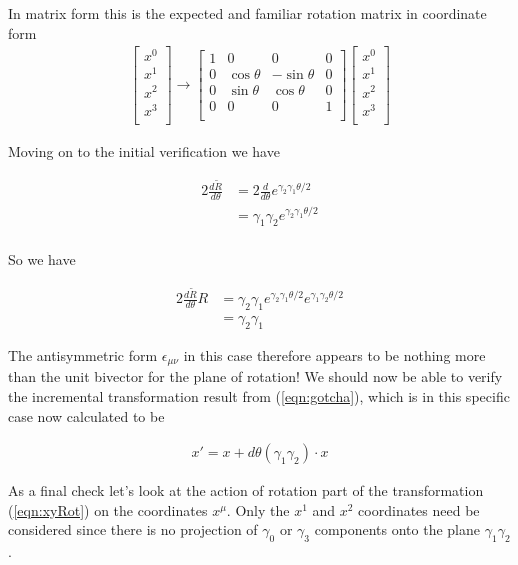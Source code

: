 In matrix form this is the expected and familiar rotation matrix in coordinate form
\begin{align*}
\begin{bmatrix}
x^0 \\
x^1 \\
x^2 \\
x^3 \\
\end{bmatrix}
\rightarrow
\begin{bmatrix}
1 & 0 & 0 & 0 \\
0 & \cos\theta & -\sin\theta & 0 \\
0 & \sin\theta & \cos\theta & 0 \\
0 & 0 & 0 & 1 \\
\end{bmatrix}
\begin{bmatrix}
x^0 \\
x^1 \\
x^2 \\
x^3 \\
\end{bmatrix}
\end{align*}

Moving on to the initial verification we have

\begin{align*}
2 \frac{d\tilde{R}}{d\theta} 
&= 2\frac{d}{d\theta} e^{\gamma_2\gamma_1 \theta/2} \\
&= \gamma_1 \gamma_2 e^{\gamma_2\gamma_1 \theta/2} \\
\end{align*}

So we have

\begin{align*}
2 \frac{d\tilde{R}}{d\theta} R 
&= \gamma_2 \gamma_1 e^{\gamma_2\gamma_1 \theta/2} e^{\gamma_1\gamma_2 \theta/2} \\
&= \gamma_2 \gamma_1 
\end{align*}

The antisymmetric form $\epsilon_{\mu\nu}$ in this case therefore appears to be nothing more than the unit bivector for the plane of rotation!  We should now be able to verify the incremental transformation result from (\ref{eqn:gotcha}), which is in this specific case now calculated to be

\begin{align}\label{eqn:xyRot}
x'= x + d\theta (\gamma_1 \gamma_2) \cdot x
\end{align}

As a final check let's look at the action of rotation part of the transformation (\ref{eqn:xyRot}) on the coordinates $x^\mu$.  Only the $x^1$ and $x^2$ coordinates need be considered since there is no projection of $\gamma_0$ or $\gamma_3$ components onto the plane $\gamma_1 \gamma_2$.

